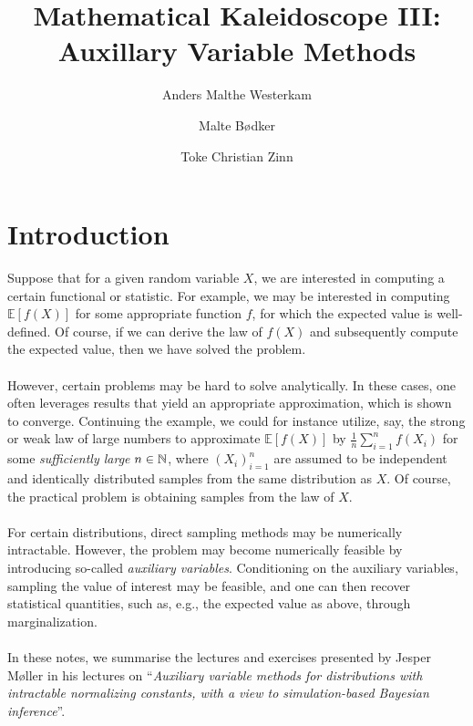 \documentclass{article}
\title{\LARGE Mathematical Kaleidoscope III: \\ \large Auxillary Variable Methods}
\author[1]{Anders Malthe Westerkam}
\author[2]{Malte Bødker}
\author[3]{Toke Christian Zinn}
\affil[1]{amw@es.aau.dk}
\affil[2]{maltebn@math.aau.dk}
\affil[3]{tokecz@math.aau.dk}
\begin{document}
\maketitle
\section*{Introduction}
Suppose that for a given random variable $X$, we are interested in computing a certain functional or statistic. For example, we may be interested in computing $\mathbb{E}[f(X)]$ for some appropriate function $f$, for which the expected value is well-defined. Of course, if we can derive the law of $f(X)$ and subsequently compute the expected value, then we have solved the problem. \\\\
However, certain problems may be hard to solve analytically. In these cases, one often leverages results that yield an appropriate approximation, which is shown to converge. Continuing the example, we could for instance utilize, say, the strong or weak law of large numbers to approximate  $\mathbb{E}[f(X)]$ by $\frac{1}{n} \sum_{i = 1}^n f(X_i)$ for some \textit{sufficiently large} $n\in\mathbb{N}$, where $(X_i)_{i = 1}^n$ are assumed to be independent and identically distributed samples from the same distribution as $X$. Of course, the practical problem is obtaining samples from the law of $X$. \\\\
For certain distributions, direct sampling methods may be numerically intractable. However, the problem may become numerically feasible by introducing so-called \textit{auxiliary variables}. Conditioning on the auxiliary variables, sampling the value of interest may be feasible, and one can then recover statistical quantities, such as, e.g., the expected value as above, through marginalization. \\\\
In these notes, we summarise the lectures and exercises presented by Jesper Møller in his lectures on ``\textit{Auxiliary variable methods for distributions with intractable normalizing constants, with a view to simulation-based Bayesian inference}''.
\end{document}
